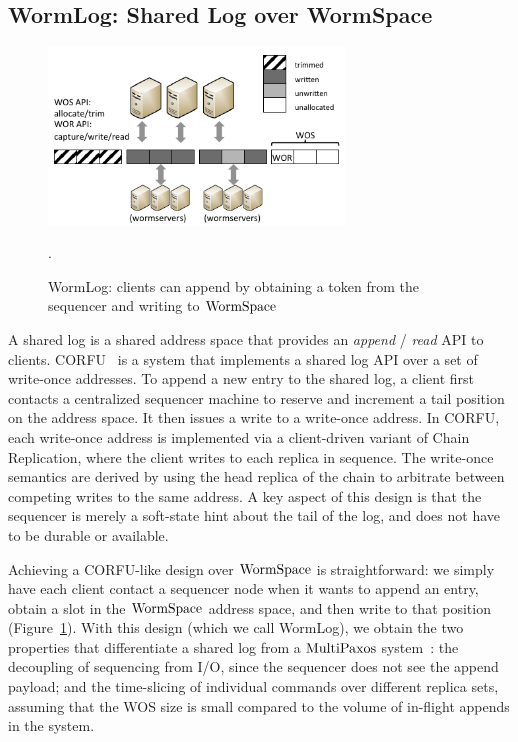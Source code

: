 \subsection{WormLog: Shared Log over WormSpace}
\label{chapter:wormspace:subsec:wormlog}

\begin{figure}
\centering
\includegraphics[width=0.7\textwidth, page=3]{figs/multipaxos/pics.pdf}
\caption{WormLog: clients can append by obtaining a token from the sequencer and writing to $\mathrm{WormSpace}$}
.\label{fig:wormlogarch}
\end{figure}

A shared log is a shared address space that provides an \textit{append} / \textit{read} API to clients. 
CORFU~\cite{corfu} is a system that implements a shared log API over a set of write-once addresses. 
To append a new entry to the shared log, a client first contacts a centralized sequencer machine to reserve and increment 
a tail position on the address space. It then issues a write to a write-once address. In CORFU, 
each write-once address is implemented via a client-driven variant of Chain Replication, 
where the client writes to each replica in sequence. 
The write-once semantics are derived by using the head replica of the chain to arbitrate between competing writes to the same address.
 A key aspect of this design is that the sequencer is merely a soft-state hint about the tail of the log, and does not have to be durable or available. 

Achieving a CORFU-like design over $\mathrm{WormSpace}$ is straightforward: 
we simply have each client contact a sequencer node when it wants to append an entry, obtain a slot in the $\mathrm{WormSpace}$ address space, 
and then write to that position (Figure~\ref{fig:wormlogarch}). 
With this design (which we call WormLog), 
we obtain the two properties that differentiate a shared log from a $\mathrm{MultiPaxos}$ system~\cite{corfupaxos}: the decoupling of sequencing 
from I/O, since the sequencer does not see the append payload; and the time-slicing of individual commands over different replica sets, 
assuming that the WOS size is small compared to the volume of in-flight appends in the system.

